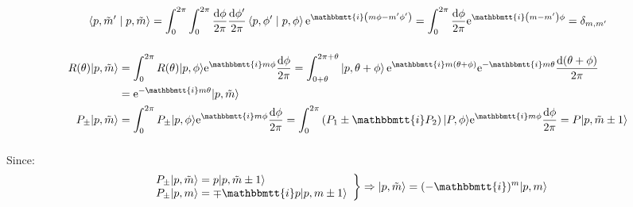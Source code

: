 \documentclass[]{ctexart}
\newcommand{\mi}{\mathbbmtt{i}}
\newcommand{\di}{\mathrm{d}}
\newcommand{\me}{\mathrm{e}}
\begin{document}
		\subsubsection{}
			\begin{equation*}
			\begin{aligned}
				\left\langle p, \tilde{m}^{\prime} \mid p, \tilde{m}\right\rangle=\int_{0}^{2 \pi} \int_{0}^{2 \pi} \frac{\di \phi}{2 \pi} \frac{\di \phi^{\prime}}{2 \pi}\left\langle p, \phi^{\prime} \mid p, \phi\right\rangle \me^{\mi\left(m \phi-m^{\prime} \phi^{\prime}\right)}=\int_{0}^{2 \pi} \frac{\di \phi}{2 \pi} \me^{\mi\left(m-m^{\prime}\right) \phi}=\delta_{m,m'}
			\end{aligned}
			\end{equation*}
			
		\subsubsection{}
			\begin{equation*}
			\begin{aligned}
				R(\theta)|p, \tilde{m}\rangle &=\int_{0}^{2 \pi} R(\theta)|p, \phi\rangle \me^{\mi m \phi} \frac{\di \phi}{2 \pi}=\int_{0+\theta}^{2 \pi+\theta}\left|p,\theta+\phi\right\rangle \me^{\mi m(\theta+\phi)} \me^{-\mi m \theta} \frac{\di(\theta+\phi)}{2 \pi} \\
				&=\me^{-\mi m \theta}|p, \tilde{m}\rangle\\
				P_{\pm}|p, \tilde{m}\rangle&=\int_{0}^{2 \pi} P_{\pm}|p, \phi\rangle \me^{\mi m \phi} \frac{\di \phi}{2 \pi}=\int_{0}^{2 \pi}\left(P_{1} \pm \mi P_{2}\right)|P, \phi\rangle \me^{\mi m \phi} \frac{\di \phi}{2 \pi}=P|p, \tilde{m} \pm 1\rangle
			\end{aligned}
			\end{equation*}
			
	\subsubsection{}
		Since:
			\begin{equation*}
				\left.\begin{array}{l}
				P_{\pm}|p, \tilde{m}\rangle=p|p, \tilde{m} \pm 1\rangle \\
				P_{\pm}|p, m\rangle=\mp \mi p|p, m \pm 1\rangle
				\end{array}\right\} \Rightarrow|p, \tilde{m}\rangle=(-\mi)^{m}|p, m\rangle
			\end{equation*}
			
\end{document}
